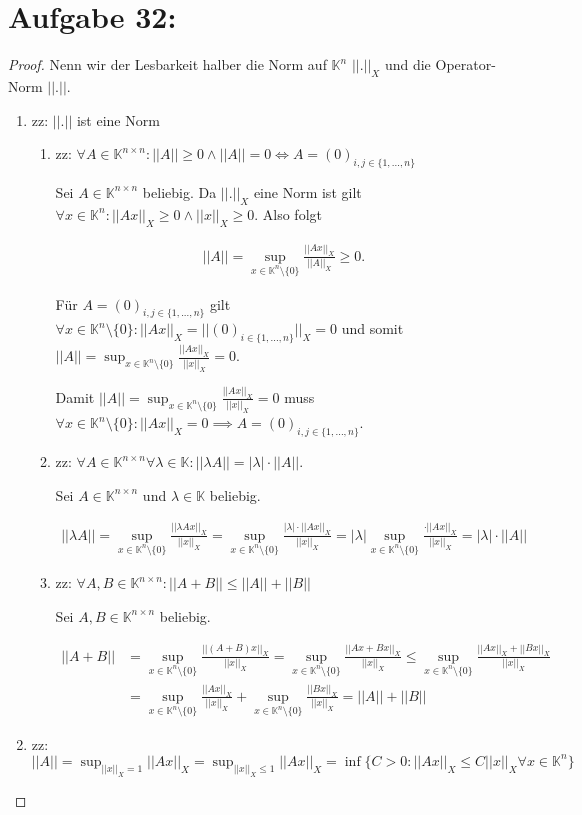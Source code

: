 \documentclass[]{article}
\newcommand{\norm}[1]{||#1||}
\newcommand{\normx}[1]{\norm{#1}_X}
\newcommand{\Azero}{(0)_{i,j \in \{1,...,n\}}}
\newcommand{\supn}{\sup_{x \in \mathbb{K}^n\setminus\{0\}}}
\newcommand{\supo}{\sup_{\normx{x}=1}}
\newcommand{\supl}{\sup_{\normx{x}\leq1}}
\begin{document}
\section{Aufgabe 32:}
\begin{proof}
	Nenn wir der Lesbarkeit halber die Norm auf $\mathbb{K}^n$ $\normx{.}$ und die Operator-Norm $\norm{.}$.
	
	\begin{enumerate}[label=\alph*)]
		\item zz: $\norm{.}$ ist eine Norm
		\begin{enumerate}[label=(N\arabic*)]
			\item zz: $\forall A \in \mathbb{K}^{n \times n}: \norm{A}\geq 0 \land \norm{A}=0 \iff A=\Azero$
			
			Sei $A \in \mathbb{K}^{n \times n}$ beliebig. Da $\normx{.}$ eine Norm ist gilt $\forall x \in \mathbb{K}^n: \normx{Ax} \geq 0 \land \normx{x} \geq 0$. Also folgt
			
			\begin{align*}
				\norm{A}=\supn\frac{\normx{Ax}}{\normx{A}}\geq 0.
			\end{align*}
		
			Für $A=\Azero$ gilt $\forall x \in \mathbb{K}^n\setminus\{0\}: \normx{Ax} = \normx{(0)_{i\in\{1,...,n\}}} = 0$ und somit $\norm{A}=\supn\frac{\normx{Ax}}{\normx{x}}=0$.
			
			Damit $\norm{A}=\supn\frac{\normx{Ax}}{\normx{x}}=0$ muss $\forall x \in \mathbb{K}^n\setminus\{0\}: \normx{Ax} = 0 \implies A = \Azero$.
			
			\item zz: $\forall A \in \mathbb{K}^{n\times n} \forall \lambda \in \mathbb{K}: \norm{\lambda A} = |\lambda|\cdot\norm{A}$.
			
			Sei $A \in \mathbb{K}^{n \times n}$ und $\lambda \in \mathbb{K}$  beliebig.
			
			\begin{align*}
				\norm{\lambda A} = \supn\frac{\normx{\lambda Ax}}{\normx{x}} = \supn\frac{|\lambda|\cdot\normx{Ax}}{\normx{x}} = |\lambda| \supn\frac{\cdot\normx{Ax}}{\normx{x}} = |\lambda|\cdot \norm{A}
			\end{align*}
		
			\item zz: $\forall A, B \in \mathbb{K}^{n \times n}: \norm{A+B}\leq \norm{A}+\norm{B}$
			
			Sei $A, B \in \mathbb{K}^{n \times n}$ beliebig.
			
			\begin{align*}
				\norm{A+B} &= \supn\frac{\normx{(A+B)x}}{\normx{x}} = \supn\frac{\normx{Ax+Bx}}{\normx{x}} \leq \supn\frac{\normx{Ax}+\normx{Bx}}{\normx{x}}\\
				&= \supn\frac{\normx{Ax}}{\normx{x}} + \supn\frac{\normx{Bx}}{\normx{x}} = \norm{A} + \norm{B}
			\end{align*}
		\end{enumerate}
	
		\item zz: $\norm{A}=\supo\normx{Ax}=\supl\normx{Ax}=\inf\{C>0: \normx{Ax}\leq C\normx{x} \forall x \in \mathbb{K}^n\}$
	\end{enumerate}
\end{proof}
\end{document}
